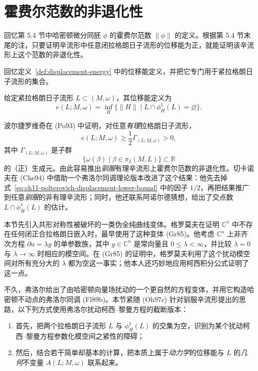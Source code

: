 \section{霍费尔范数的非退化性}
\label{sec:nondegeneracy-hofer-norm}

回忆第 5.4 节中哈密顿微分同胚 $\phi$ 的霍费尔范数
$\lVert\phi\rVert$ 的定义。根据第 5.4 节末尾的注，只要证明辛流形中任意闭拉格朗日子流形的位移能为正，就能证明该辛流形上这个范数的非退化性。

回忆定义~\ref{def:displacement-energy} 中的位移能定义，并把它专门用于紧拉格朗日子流形的集合。

\begin{definition}\label{def:ch11-lagrangian-displacement-energy}
给定紧拉格朗日子流形 $L\subset(M,\omega)$，其位移能定义为
\[
 e(L;M,\omega)=\inf_H
 \{\lVert H\rVert\mid L\cap\phi_H^1(L)=\varnothing\}.
\]
\end{definition}

波尔捷罗维奇在 (Po93) 中证明，对任意\emph{有理}拉格朗日子流形，
\begin{equation}
 e(L;M,\omega)\geq\frac12\Gamma_{(L;M,\omega)}>0,
 \label{eq:ch11-polterovich-displacement-lower-bound}
\end{equation}
其中 $\Gamma_{(L;M,\omega)}$ 是子群
\[
 \{\omega(\beta)\mid\beta\in\pi_2(M,L)\}\subset\mathbb R
\]
的（正）生成元。由此容易推出\emph{驯服}有理辛流形上霍费尔范数的非退化性。切卡诺夫在 (Che94) 中借助一个弗洛尔同调理论版本改进了这个结果：他先去掉式~\eqref{eq:ch11-polterovich-displacement-lower-bound} 中的因子 $1/2$，再把结果推广到任意\emph{驯服}的非有理辛流形；同时，他还联系阿诺尔德猜想，给出了交点数
$L\cap\phi_H^1(L)$ 的估计。

本节先引入共形对称性被破坏的一类伪全纯曲线变体。格罗莫夫在证明
$\mathbb C^n$ 中不存在任何闭正合拉格朗日嵌入时，最早使用了这种变体 (Gr85)。他考虑 $\mathbb C^n$ 上非齐次方程
$\overline\partial u=\lambda g$ 的单参数族，其中 $g\in\mathbb C^n$ 是常向量且 $0\leq\lambda<\infty$，并比较 $\lambda=0$ 与 $\lambda\to\infty$ 时相应的模空间。在 (Gr85) 的证明中，格罗莫夫利用了这个扰动模空间对所有充分大的 $\lambda$ 都为空这一事实；他本人还巧妙地应用柯西积分公式证明了这一点。

不久，弗洛尔给出了由哈密顿向量场扰动的一个更自然的方程变体，并用它构造哈密顿不动点的弗洛尔同调 (Fl89b)。本节紧随 (Oh97c) 针对驯服辛流形提出的思路，以下列方式使用弗洛尔扰动柯西--黎曼方程的截断版本：
\begin{enumerate}[label=(\arabic*)]
 \item 首先，把两个拉格朗日子流形 $L$ 与 $\phi_H^1(L)$ 的交集为空，识别为某个扰动柯西--黎曼方程参数化模空间之紧性的障碍；
 \item 然后，结合若干简单却基本的计算，把本质上属于\emph{动力学}的位移能与 $L$ 的\emph{几何}不变量 $A(L;M,\omega)$ 联系起来。
\end{enumerate}

